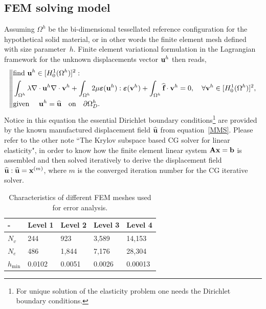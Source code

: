 \subsection{FEM solving model}
Assuming $\Omega^h$ be the bi-dimensional tessellated reference configuration for the hypothetical solid material, or in other words the finite element mesh defined with size parameter~$h$. Finite element variational formulation in the Lagrangian framework for the unknown displacements vector ${\bf{u}}^h$ then reads, 
	\begin{equation}\label{varf}
	\left\|\begin{aligned}
	&\text{find}~{\bf{u}}^h\in[H^1_0(\Omega^h)]^2:\\
	&\int_{\Omega^h}\lambda\nabla\cdot{\bf{u}}^h\nabla\cdot{\bf{v}}^h + \int_{\Omega^h}2\mu\boldsymbol\varepsilon({\bf{u}}^h):\boldsymbol\varepsilon({\bf{v}}^h)+\int_{\Omega^h}\widehat{\textbf{f}}\cdot{\bf{v}}^h=0, \quad\forall{\bf{v}}^h\in[H^1_0(\Omega^h)]^2,\\
	&\text{given}~\quad{\bf{u}}^h=\widehat{\textbf{u}}\quad\text{on}\quad\partial\Omega^h_D.
	\end{aligned}\right.
	\end{equation}
Notice in this equation the essential Dirichlet boundary conditions\footnote{For unique solution of the elasticity problem one needs the Dirichlet boundary conditions.} are provided by the known manufactured displacement field $\widehat{\textbf{u}}$ from equation~\eqref{MMS}. Please refer to the other note ``The Krylov subspace based CG solver for linear elasticity", in order to know how the finite element linear system ${{\bf{A}}}{\bf{x}}={\bf{b}}$ is assembled and then solved iteratively to derive the displacement field $\widehat{\textbf{u}}: \widehat{\textbf{u}}={\bf{x}}^{(m)}$, where $m$ is the converged iteration number for the CG iterative solver. 
	
\begin{table}[htbp]
		\centering
		\begin{tabular}{p{} p{}p{}p{}p{} }
			\hline
			 - & Level 1 & Level 2 & Level 3 & Level 4	\\ \hline
			$N_v$ & 244 & 923 & 3,589 & 14,153  \\ 
			$N_e$ & 486 & 1,844 & 7,176  & 28,304  \\ 
			$h_{\text{min}}$ & 0.0102 & 0.0051 & 0.0026 & 0.00013 \\ 
			\hline
		\end{tabular}
\caption{Characteristics of different FEM meshes used for error analysis.
} \label{tab:meshes}
\end{table}	


